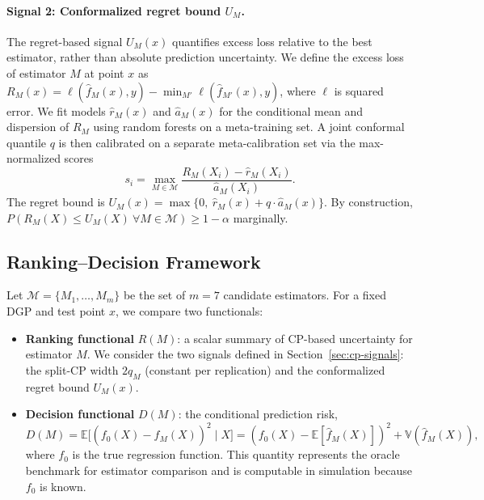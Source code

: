 \documentclass[a4paper,11pt]{article}
\begin{document}
\paragraph{Signal 2: Conformalized regret bound $U_M$.}
The regret-based signal $U_M(x)$ quantifies excess loss relative to the best estimator, rather than absolute prediction uncertainty. We define the excess loss of estimator $M$ at point $x$ as $R_M(x) = \ell(\hat{f}_M(x), y) - \min_{M'} \ell(\hat{f}_{M'}(x), y)$, where $\ell$ is squared error. We fit models $\hat{r}_M(x)$ and $\hat{a}_M(x)$ for the conditional mean and dispersion of $R_M$ using random forests on a meta-training set. A joint conformal quantile $q$ is then calibrated on a separate meta-calibration set via the max-normalized scores
\begin{equation}
    s_i = \max_{M \in \mathcal{M}} \frac{R_M(X_i) - \hat{r}_M(X_i)}{\hat{a}_M(X_i)}.
\end{equation}
The regret bound is $U_M(x) = \max\{0,\ \hat{r}_M(x) + q \cdot \hat{a}_M(x)\}$. By construction, $P(R_M(X) \leq U_M(X) \ \forall M \in \mathcal{M}) \geq 1-\alpha$ marginally.

\subsection{Ranking--Decision Framework}
\label{sec:framework}

Let $\mathcal{M} = \{M_1, \ldots, M_m\}$ be the set of $m = 7$ candidate estimators. For a fixed DGP and test point $x$, we compare two functionals:

\begin{itemize}
    \item \textbf{Ranking functional} $R(M)$: a scalar summary of CP-based uncertainty for estimator $M$. We consider the two signals defined in Section~\ref{sec:cp-signals}: the split-CP width $2q_M$ (constant per replication) and the conformalized regret bound $U_M(x)$.
    \item \textbf{Decision functional} $D(M)$: the conditional prediction risk,
    \begin{equation}
        D(M) = \mathbb{E}\bigl[(f_0(X) - \hat{f}_M(X))^2 \mid X\bigr] = (f_0(X) - \mathbb{E}[\hat{f}_M(X)])^2 + \mathbb{V}(\hat{f}_M(X)),
    \end{equation}
    where $f_0$ is the true regression function. This quantity represents the oracle benchmark for estimator comparison and is computable in simulation because $f_0$ is known.
\end{itemize}
\end{document}
